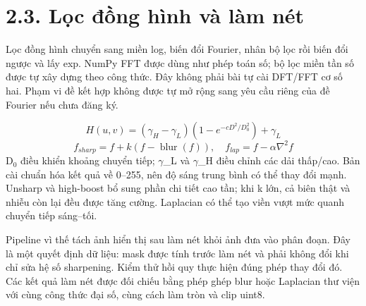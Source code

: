 \documentclass[12pt,a4paper]{extreport}
\begin{document}
\section*{2.3. Lọc đồng hình và làm nét}
Lọc đồng hình chuyển sang miền log,\allowbreak{} biến đổi Fourier,\allowbreak{} nhân bộ lọc rồi biến đổi ngược và lấy exp. NumPy FFT được dùng như phép toán số; bộ lọc miền tần số được tự xây dựng theo công thức. Đây không phải bài tự cài DFT/\allowbreak{}FFT cơ số hai. Phạm vi đề kết hợp không được tự mở rộng sang yêu cầu riêng của đề Fourier nếu chưa đăng ký.
\par
\begin{equation}H(u,v)=(\gamma_H-\gamma_L)(1-e^{-cD^2/D_0^2})+\gamma_L\tag{2.8}\end{equation}
\begin{equation}f_{sharp}=f+k(f-\operatorname{blur}(f)),\quad f_{lap}=f-\alpha\nabla^2 f\tag{2.9}\end{equation}
D\ensuremath{{}_0} điều khiển khoảng chuyển tiếp; \ensuremath{\gamma}\_L và \ensuremath{\gamma}\_H điều chỉnh các dải thấp/\allowbreak{}cao. Bản cài chuẩn hóa kết quả về 0–255,\allowbreak{} nên độ sáng trung bình có thể thay đổi mạnh. Unsharp và high-boost bổ sung phần chi tiết cao tần; khi k lớn,\allowbreak{} cả biên thật và nhiễu còn lại đều được tăng cường. Laplacian có thể tạo viền vượt mức quanh chuyển tiếp sáng–tối.
\par
Pipeline vì thế tách ảnh hiển thị sau làm nét khỏi ảnh đưa vào phân đoạn. Đây là một quyết định dữ liệu: mask được tính trước làm nét và phải không đổi khi chỉ sửa hệ số sharpening. Kiểm thử hồi quy thực hiện đúng phép thay đổi đó. Các kết quả làm nét được đối chiếu bằng phép ghép blur hoặc Laplacian thư viện với cùng công thức đại số,\allowbreak{} cùng cách làm tròn và clip uint8.
\par
\end{document}
